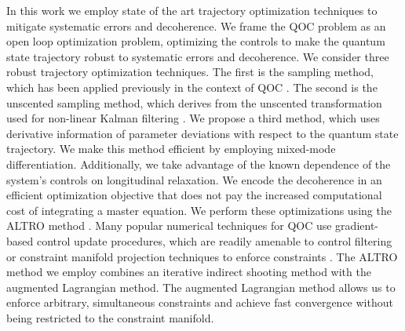 In this work we employ state of the art trajectory optimization techniques
to mitigate systematic errors and decoherence. We frame the QOC problem as an
open loop optimization problem, optimizing the controls to make the
quantum state trajectory robust to systematic errors and decoherence.
We consider three robust trajectory optimization techniques.
The first is the sampling method, which has been applied
previously in the context of QOC
\cite{carvalho2020error, reinhold2019controlling, rembold2020introduction}.
The second is the unscented sampling
method, which derives from the unscented transformation used
for non-linear Kalman filtering
\cite{julier2004unscented, lee2013sigma, manchester2016derivative}.
We propose a third method, which uses derivative information
of parameter deviations with respect to the quantum state trajectory.
We make this method efficient by employing mixed-mode differentiation.
Additionally, we take advantage of the known dependence of the
system's controls on longitudinal relaxation. We encode
the decoherence in an efficient optimization objective that does
not pay the increased computational cost of integrating a master equation.
We perform these optimizations using the ALTRO method \cite{howell2019altro}.
Many popular numerical techniques
for QOC use gradient-based control update procedures, which are readily amenable to control filtering
or constraint manifold projection techniques to enforce constraints \cite{leung2017speedup,
  goer2019krotov, abdelhafez2019gradient, machnes2015gradient}.
The ALTRO method we employ combines
an iterative indirect shooting method with the augmented Lagrangian
method. The augmented Lagrangian method
allows us to enforce arbitrary, simultaneous constraints and achieve
fast convergence without being restricted to the constraint
manifold.

